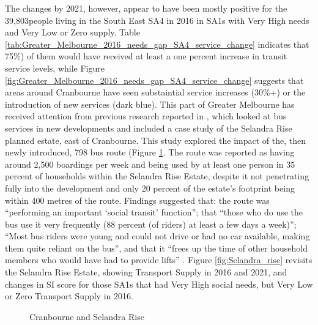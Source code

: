 \documentclass[preprint, 3p,
authoryear]{elsarticle} %
\begin{document}
The changes by 2021, however, appear to have been mostly positive for
the 39,803people living in the South East SA4 in 2016 in SA1s with Very
High needs and Very Low or Zero supply. Table
\ref{tab:Greater_Melbourne_2016_needs_gap_SA4_service_change} indicates
that 75\%) of them would have received at least a one percent increase
in transit service levels, while Figure
\ref{fig:Greater_Melbourne_2016_needs_gap_SA4_service_change} suggests
that areas around Cranbourne have seen substaintial service increases
(30\%+) or the introduction of new services (dark blue). This part of
Greater Melbourne has received attention from previous research reported
in \citet{delbosc2015impact}, which looked at bus services in new
developments and included a case study of the Selandra Rise planned
estate, east of Cranbourne. This study explored the impact of the, then
newly introduced, 798 bus route (Figure \ref{fig:Bus_798}. The route was
reported as having around 2,500 boardings per week and being used by at
least one person in 35 percent of households within the Selandra Rise
Estate, despite it not penetrating fully into the development and only
20 percent of the estate's footprint being within 400 metres of the
route. Findings suggested that: the route was ``performing an important
`social transit' function''; that ``those who do use the bus use it very
frequently (88 percent (of riders) at least a few days a week)''; ``Most
bus riders were young and could not drive or had no car available,
making them quite reliant on the bus'', and that it ``frees up the time
of other household members who would have had to provide lifts''
\citep[p.10]{delbosc2015impact}. Figure \ref{fig:Selandra_rise} revisits
the Selandra Rise Estate, showing Transport Supply in 2016 and 2021, and
changes in SI score for those SA1s that had Very High social needs, but
Very Low or Zero Transport Supply in 2016.

\begin{figure}

{\centering {}

}

\caption{Cranbourne and Selandra Rise}\label{fig:Bus_798}
\end{figure}
\end{document}
